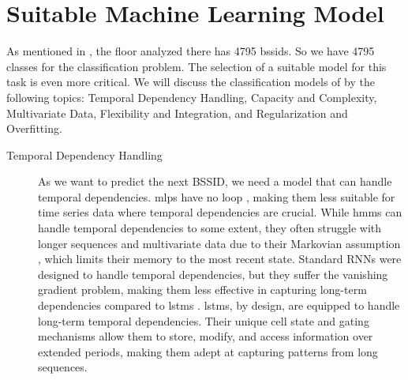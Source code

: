 \chapter{Suitable Machine Learning Model}\label{ch:discuss-ml}

% 

As mentioned in , the floor analyzed there has 4795 \acp{bssid}.
So we have 4795 classes for the classification problem.
The selection of a suitable model for this task is even more critical.
We will discuss the classification models of  by the following topics: Temporal Dependency Handling, Capacity and Complexity, Multivariate Data, Flexibility and Integration, and Regularization and Overfitting. \\

\begin{description}
\item[Temporal Dependency Handling]
As we want to predict the next BSSID, we need a model that can handle temporal dependencies.
\acp{mlp} have no loop \cite{mlp_and_nn}, making them less suitable for time series data where temporal dependencies are crucial.
While \acp{hmm} can handle temporal dependencies to some extent, they often struggle with longer sequences and multivariate data due to their Markovian assumption \cite{hmm-rabiner-1989}, which limits their memory to the most recent state.
Standard RNNs were designed to handle temporal dependencies, but they suffer the vanishing gradient problem, making them less effective in capturing long-term dependencies compared to \acp{lstm} \cite{rnn_difficulties_2013}.
\acp{lstm}, by design, are equipped to handle long-term temporal dependencies. Their unique cell state and gating mechanisms allow them to store, modify, and access information over extended periods, making them adept at capturing patterns from long sequences. \cite{lstm-hochreiter}
\end{description}

